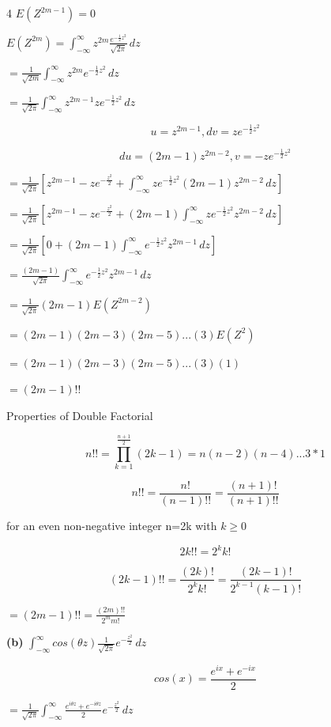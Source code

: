 \documentclass[12 pt]{article}
\begin{document}
\begin{exercise}{4}
    $E(Z^{2m-1}) = 0$

    \hfill

    $E(Z^{2m}) = \int_{-\infty}^{\infty} z^{2m} \frac{e^{- \frac{1}{2}z^2}}{\sqrt{2 \pi}} \, dz$

    $= \frac{1}{\sqrt{2m}} \int_{-\infty}^{\infty} z^{2m}e^{-\frac{1}{2}z^2} \, dz$

    $= \frac{1}{\sqrt{2 \pi}} \int_{-\infty}^{\infty} z^{2m-1} z e^{-\frac{1}{2}z^2} \, dz$

    $$u = z^{2m-1}, dv = z e^{-\frac{1}{2}z^2}$$

    $$du = (2m-1)z^{2m-2}, v= -ze^{-\frac{1}{2}z^2}$$

    $= \frac{1}{\sqrt{2 \pi}} [z^{2m-1} - ze^{-\frac{z^2}{2}} + \int_{-\infty}^{\infty} z e^{-\frac{1}{2}z^2} (2m-1)z^{2m-2} \, dz]$

    $= \frac{1}{\sqrt{2 \pi}} [z^{2m-1} - ze^{-\frac{z^2}{2}} + (2m-1) \int_{-\infty}^{\infty} z e^{-\frac{1}{2}z^2} z^{2m-2} \, dz]$

    $= \frac{1}{\sqrt{2 \pi}} [0 + (2m-1) \int_{-\infty}^{\infty} e^{-\frac{1}{2}z^2} z^{2m-1} \, dz]$

     $= \frac{(2m-1)}{\sqrt{2 \pi}} \int_{-\infty}^{\infty} e^{-\frac{1}{2}z^2} z^{2m-1} \, dz$

     $= \frac{1}{\sqrt{2 \pi}} (2m-1) E(Z^{2m-2})$

     $= (2m-1)(2m-3)(2m-5)...(3)E(Z^2)$

     $= (2m-1)(2m-3)(2m-5)...(3)(1)$

     $=(2m-1)!!$

     Properties of Double Factorial

     $$n!! = \prod_{k=1}^{\frac{n+1}{2}} (2k-1) = n(n-2)(n-4)...3*1$$

     $$n!! = \frac{n!}{(n-1)!!} = \frac{(n+1)!}{(n+1)!!}$$

     for an even non-negative integer n=2k with $k \geq 0$

     $$2k!! = 2^k k!$$

     $$(2k-1)!! = \frac{(2k)!}{2^k k!} = \frac{(2k-1)!}{2^{k-1}(k-1)!}$$

     $= (2m-1)!! = \frac{(2m)!!}{2^m m!}$

     \hfill

     \textbf{(b)} $\int_{-\infty}^{\infty} cos(\theta z) \frac{1}{\sqrt{2 \pi}} e^{-\frac{z^2}{2}} \, dz$

     $$cos(x) = \frac{e^{ix} + e^{-ix}}{2}$$

     $= \frac{1}{\sqrt{2 \pi}} \int_{-\infty}^{\infty} \frac{e^{i\theta z} + e^{-i \theta z}}{2} e^{-\frac{z^2}{2}} \, dz$


\end{exercise}
\end{document}
